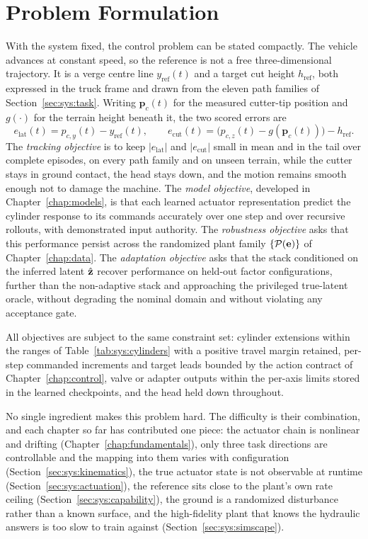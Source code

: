 \section{Problem Formulation}
\label{sec:sys:problem}

With the system fixed, the control problem can be stated compactly.
The vehicle advances at constant speed, so the reference is not a free
three-dimensional trajectory. It is a verge centre line
$y_{\mathrm{ref}}(t)$ and a target cut height $h_{\mathrm{ref}}$, both
expressed in the truck frame and drawn from the eleven path families of
Section~\ref{sec:sys:task}. Writing $\bm{p}_c(t)$ for the measured
cutter-tip position and $g(\cdot)$ for the terrain height beneath it,
the two scored errors are
%
\begin{equation}
  \label{eq:sys:error}
  e_{\mathrm{lat}}(t) = p_{c,y}(t) - y_{\mathrm{ref}}(t),
  \qquad
  e_{\mathrm{cut}}(t)
    = \bigl(p_{c,z}(t) - g(\bm{p}_c(t))\bigr) - h_{\mathrm{ref}} .
\end{equation}
%
The \emph{tracking objective} is to keep $|e_{\mathrm{lat}}|$ and
$|e_{\mathrm{cut}}|$ small in mean and in the tail over complete
episodes, on every path family and on unseen terrain, while the cutter
stays in ground contact, the head stays down, and the motion remains
smooth enough not to damage the machine. The \emph{model objective},
developed in Chapter~\ref{chap:models}, is that each learned actuator
representation predict the cylinder response to its commands accurately
over one step and over recursive rollouts, with demonstrated input
authority. The \emph{robustness objective} asks that this performance
persist across the randomized plant family $\{\mathcal{P}(\mathbf{e})\}$
of Chapter~\ref{chap:data}. The \emph{adaptation objective} asks that
the stack conditioned on the inferred latent $\hat{\mathbf{z}}$ recover
performance on held-out factor configurations, further than the
non-adaptive stack and approaching the privileged true-latent oracle,
without degrading the nominal domain and without violating any
acceptance gate.

All objectives are subject to the same constraint set: cylinder
extensions within the ranges of Table~\ref{tab:sys:cylinders} with a
positive travel margin retained, per-step commanded increments and
target leads bounded by the action contract of
Chapter~\ref{chap:control}, valve or adapter outputs within the per-axis
limits stored in the learned checkpoints, and the head held down
throughout.

No single ingredient makes this problem hard. The difficulty is their
combination, and each chapter so far has contributed one piece: the actuator chain is nonlinear and drifting
(Chapter~\ref{chap:fundamentals}), only three task directions are
controllable and the mapping into them varies with configuration
(Section~\ref{sec:sys:kinematics}), the true actuator state is not
observable at runtime (Section~\ref{sec:sys:actuation}), the reference
sits close to the plant's own rate ceiling
(Section~\ref{sec:sys:capability}), the ground is a randomized
disturbance rather than a known surface, and the high-fidelity plant
that knows the hydraulic answers is too slow to train against
(Section~\ref{sec:sys:simscape}).

